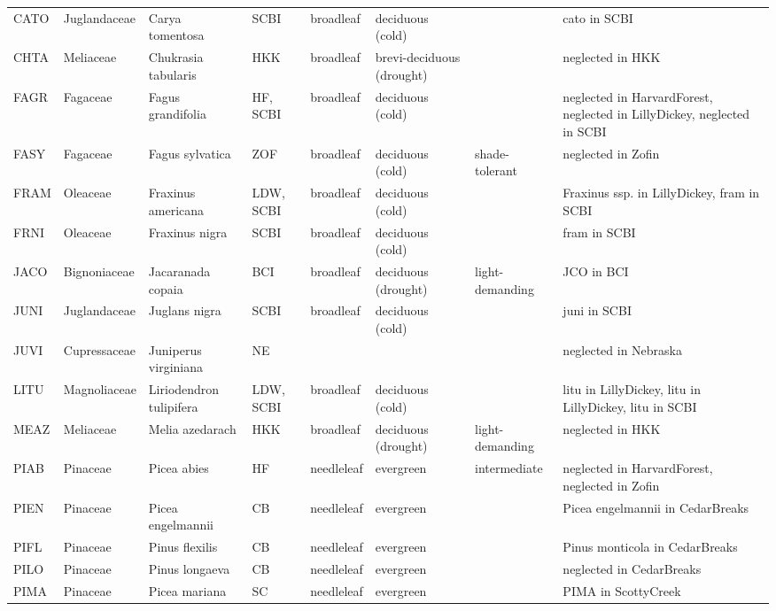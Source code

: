 \documentclass[
]{article}
\begin{document}
\begin{table}[!h]
{\begin{tabular}{lllllll>{\raggedright\arraybackslash}p{5cm}}
\addlinespace
CATO & Juglandaceae & Carya tomentosa & SCBI & broadleaf & deciduous (cold) &  & cato in SCBI\\
\addlinespace
CHTA & Meliaceae & Chukrasia tabularis & HKK & broadleaf & brevi-deciduous (drought) &  & neglected in HKK\\
\addlinespace
FAGR & Fagaceae & Fagus grandifolia & HF, SCBI & broadleaf & deciduous (cold) &  & neglected in HarvardForest, neglected in LillyDickey, neglected in SCBI\\
\addlinespace
FASY & Fagaceae & Fagus sylvatica & ZOF & broadleaf & deciduous (cold) & shade-tolerant & neglected in Zofin\\
\addlinespace
FRAM & Oleaceae & Fraxinus americana & LDW, SCBI & broadleaf & deciduous (cold) &  & Fraxinus ssp. in LillyDickey, fram in SCBI\\
\addlinespace
FRNI & Oleaceae & Fraxinus nigra & SCBI & broadleaf & deciduous (cold) &  & fram in SCBI\\
\addlinespace
JACO & Bignoniaceae & Jacaranada copaia & BCI & broadleaf & deciduous (drought) & light-demanding & JCO in BCI\\
\addlinespace
JUNI & Juglandaceae & Juglans nigra & SCBI & broadleaf & deciduous (cold) &  & juni in SCBI\\
\addlinespace
JUVI & Cupressaceae & Juniperus virginiana & NE &  &  &  & neglected in Nebraska\\
\addlinespace
LITU & Magnoliaceae & Liriodendron tulipifera & LDW, SCBI & broadleaf & deciduous (cold) &  & litu in LillyDickey, litu in LillyDickey, litu in SCBI\\
\addlinespace
MEAZ & Meliaceae & Melia azedarach & HKK & broadleaf & deciduous (drought) & light-demanding & neglected in HKK\\
\addlinespace
PIAB & Pinaceae & Picea abies & HF & needleleaf & evergreen & intermediate & neglected in HarvardForest, neglected in Zofin\\
\addlinespace
PIEN & Pinaceae & Picea engelmannii & CB & needleleaf & evergreen &  & Picea engelmannii in CedarBreaks\\
\addlinespace
PIFL & Pinaceae & Pinus flexilis & CB & needleleaf & evergreen &  & Pinus monticola in CedarBreaks\\
\addlinespace
PILO & Pinaceae & Pinus longaeva & CB & needleleaf & evergreen &  & neglected in CedarBreaks\\
\addlinespace
PIMA & Pinaceae & Picea mariana & SC & needleleaf & evergreen &  & PIMA in ScottyCreek\\

\end{tabular}}
\end{table}
\end{document}
